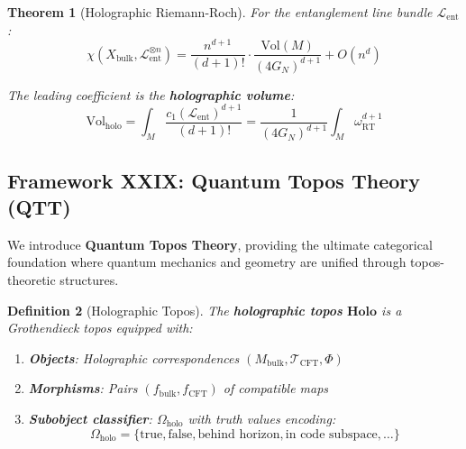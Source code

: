 \documentclass[12pt,a4paper]{article}
\newtheorem{theorem}{Theorem}[section]
\newtheorem{definition}[theorem]{Definition}
\begin{document}
\begin{theorem}[Holographic Riemann-Roch]\label{thm:holo-rr}
For the entanglement line bundle $\mathcal{L}_{\text{ent}}$:
\begin{equation}
\chi(X_{\text{bulk}}, \mathcal{L}_{\text{ent}}^{\otimes n}) = \frac{n^{d+1}}{(d+1)!} \cdot \frac{\text{Vol}(M)}{(4G_N)^{d+1}} + O(n^d)
\end{equation}

The leading coefficient is the \textbf{holographic volume}:
\begin{equation}
\text{Vol}_{\text{holo}} = \int_M \frac{c_1(\mathcal{L}_{\text{ent}})^{d+1}}{(d+1)!} = \frac{1}{(4G_N)^{d+1}} \int_M \omega_{\text{RT}}^{d+1}
\end{equation}
\end{theorem}

\subsection{Framework XXIX: Quantum Topos Theory (QTT)}
\label{subsec:quantum-topos-theory}

We introduce \textbf{Quantum Topos Theory}, providing the ultimate categorical foundation where quantum mechanics and geometry are unified through topos-theoretic structures.

\begin{definition}[Holographic Topos]\label{def:holo-topos}
The \textbf{holographic topos} $\mathbf{Holo}$ is a Grothendieck topos equipped with:
\begin{enumerate}
    \item \textbf{Objects}: Holographic correspondences $(M_{\text{bulk}}, \mathcal{T}_{\text{CFT}}, \Phi)$
    \item \textbf{Morphisms}: Pairs $(f_{\text{bulk}}, f_{\text{CFT}})$ of compatible maps
    \item \textbf{Subobject classifier}: $\Omega_{\text{holo}}$ with truth values encoding:
    \begin{equation}
    \Omega_{\text{holo}} = \{ \text{true}, \text{false}, \text{behind horizon}, \text{in code subspace}, \ldots \}
    \end{equation}
\end{enumerate}
\end{definition}
\end{document}
